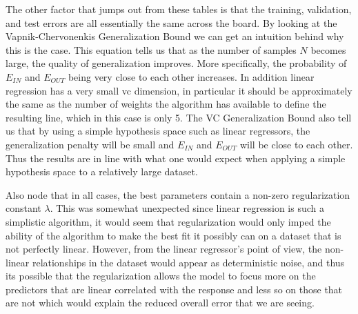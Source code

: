 \documentclass[runningheads]{llncs_2}
\begin{document}
The other factor that jumps out from these tables is that the training, validation, and test errors are all essentially the same across the board. By looking at the Vapnik-Chervonenkis Generalization Bound we can get an intuition behind why this is the case. This equation tells us that as the number of samples $N$ becomes large, the quality of generalization improves. More specifically, the probability of $E_{IN}$ and $E_{OUT}$ being very close to each other increases. In addition linear regression has a very small vc dimension, in particular it should be approximately the same as the number of weights the algorithm has available to define the resulting line, which in this case is only 5. The VC Generalization Bound also tell us that by using a simple hypothesis space such as linear regressors, the generalization penalty will be small and $E_{IN}$ and $E_{OUT}$ will be close to each other. Thus the results are in line with what one would expect when applying a simple hypothesis space to a relatively large dataset.

Also node that in all cases, the best parameters contain a non-zero regularization constant $\lambda$. This was somewhat unexpected since linear regression is such a simplistic algorithm, it would seem that regularization would only imped the ability of the algorithm to make the best fit it possibly can on a dataset that is not perfectly linear. However, from the linear regressor's point of view, the non-linear relationships in the dataset would appear as deterministic noise, and thus its possible that the regularization allows the model to focus more on the predictors that are linear correlated with the response and less so on those that are not which would explain the reduced overall error that we are seeing.
\end{document}
